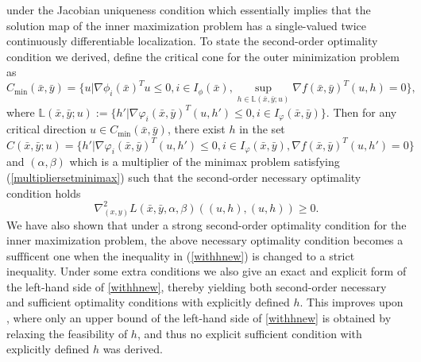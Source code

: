 \documentclass[11pt]{article}
\numberwithin{equation}{section}
\begin{document}
 \cite[Theorems 3.1]{DaiZh-2020} under the Jacobian uniqueness condition which essentially implies that the solution map of the inner maximization problem has a single-valued  twice continuously differentiable localization.
 To state the  second-order optimality condition we derived, define
  the critical cone for the outer minimization problem as  $$ C_{\min}(\bar x,\bar y)
	=\{ u|\nabla \phi_i(\bar x)^T u \leq 0, i\in I_\phi(\bar x), \sup\limits_{h \in \mathbb{L}(\bar x,\bar y;u)} \nabla f(\bar x,\bar y)^T(u,h) =  0\},$$
	where  $\mathbb{L}(\bar x,\bar y;u) :=\{h'|\nabla \varphi_i(\bar x,\bar y)^T (u,h') \leq 0, i \in I_{\varphi}(\bar x,\bar y)\}.$
 Then for any critical direction $u \in C_{\min}(\bar x,\bar y)$, there exist $h$ 
  in the set  $$ C(\bar x,\bar y;u)= 
	 \{h'| \nabla \varphi_i(\bar x,\bar y)^T (u,h') \leq 0, i \in I_{\varphi}(\bar x,\bar y), \nabla f(\bar x,\bar y)^T (u,h') = 0 \}
$$
 and  $(\alpha,\beta)$ which is a multiplier  of the minimax problem satisfying (\ref{multipliersetminimax}) such that the second-order necessary optimality condition holds
\begin{equation}\label{withhnew}
\nabla^2_{(x,y)} L(\bar x,\bar y,\alpha,\beta)((u,h),(u,h))  \geq 0.
\end{equation}
We have also shown that under a strong second-order optimality condition for the inner maximization problem, the above necessary optimality condition becomes a suffficent one when the inequality in  (\ref{withhnew}) is changed to a strict inequality.
Under some extra conditions we also give an exact and explicit form of the left-hand side of \eqref{withhnew}, thereby yielding both second-order necessary and sufficient optimality conditions with explicitly defined $h$. This improves upon \cite[Corollary 5.1]{Ma2023}, where only an upper bound of the left-hand side of \eqref{withhnew} is obtained by relaxing the feasibility of $h$, and thus no explicit sufficient condition with explicitly defined $h$  was  derived.
\end{document}
